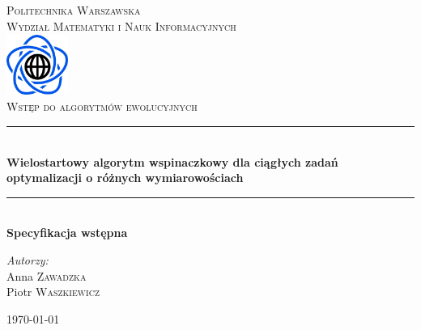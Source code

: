 \documentclass{article}
\begin{document}

\begin{titlepage}

\newcommand{\HRule}{\rule{\linewidth}{0.5mm}}

\begin{center}

\textsc{\LARGE Politechnika Warszawska}\\[0.5cm]
\textsc{\Large Wydział Matematyki i Nauk Informacyjnych}\\[1cm]

\includegraphics[width=2cm, height=2cm]{logo}\\[1cm]


\textsc{\Huge Wstęp do algorytmów ewolucyjnych}\\[0.5cm]


\HRule \\[0.4cm]
{ \LARGE \bfseries Wielostartowy algorytm wspinaczkowy dla ciągłych zadań optymalizacji o różnych wymiarowościach}\\[0.2cm]
 

\HRule \\[0.4cm]
{  \bfseries Specyfikacja wstępna}\\[2.5cm]

\begin{flushright}
	\Large \emph{Autorzy:}\\[0.5cm]
Anna \textsc{Zawadzka}\\
Piotr \textsc{Waszkiewicz}\\[1.5cm]
\end{flushright} 

\vfill
{\large \today}\\[1cm]
	
\end{center}

\end{titlepage}

\newpage
\end{document}
